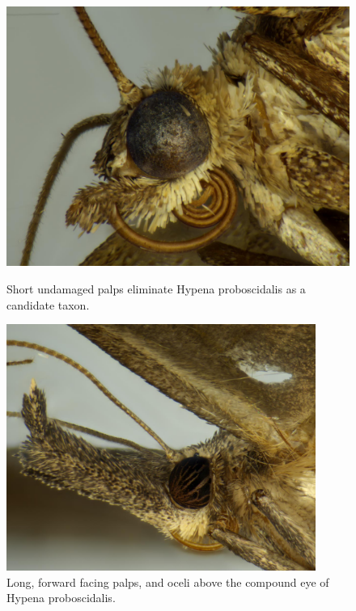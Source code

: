\documentclass[]{article}
\begin{document}
\begin{figure}
	\centering
	\begin{minipage}{0.45\textwidth}
		\centering
	\includegraphics[width=0.9\linewidth]{202009131026PJP-4}
	\caption{Short undamaged palps eliminate Hypena proboscidalis as a candidate taxon.}
	\label{fig:20201112-1}
	\end{minipage}\hfill
	\begin{minipage}{0.45\textwidth}
		\centering
		\includegraphics[width=0.9\textwidth]{S202012271446-4} %
		\caption{Long, forward facing palps, and oceli above the compound eye of Hypena proboscidalis.}
		\label{fig:S202012271446-4}
	\end{minipage}
\end{figure}
\end{document}
